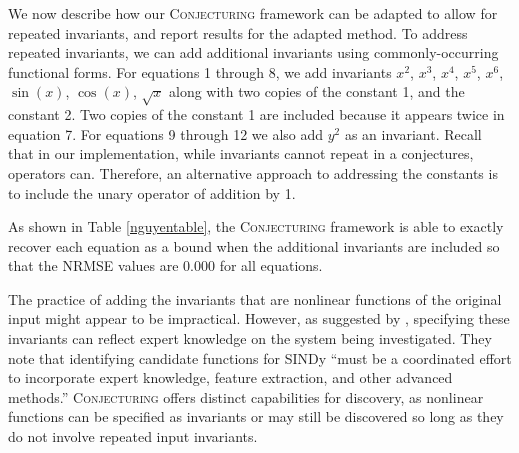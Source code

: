 \documentclass[ijds,nonblindrev]{informs-ijds}
\begin{document}
We now describe how our \textsc{Conjecturing} framework can be adapted to allow for repeated invariants, and report results for the adapted method.  To address repeated invariants, we can add additional invariants using commonly-occurring functional forms.  For equations 1 through 8, we add invariants $x^2$, $x^3$, $x^4$, $x^5$, $x^6$, $\sin(x)$, $\cos(x)$, $\sqrt{x}$ along with two copies of the constant 1, and the constant 2.  Two copies of the constant 1 are included because it appears twice in equation 7.  For equations 9 through 12 we also add $y^2$ as an invariant.  Recall that in our implementation, while invariants cannot repeat in a conjectures, operators can.  Therefore, an alternative approach to addressing the constants is to include the unary operator of addition by 1.  

As shown in Table \ref{nguyentable}, the \textsc{Conjecturing} framework is able to exactly recover each equation as a bound when the additional invariants are included so that the NRMSE values are 0.000 for all equations.

The practice of adding the invariants that are nonlinear functions of the original input might appear to be impractical.  However, as suggested by \citet{brunton}, specifying these invariants can reflect expert knowledge on the system being investigated.  They note that identifying candidate functions for SINDy ``must be a coordinated effort to incorporate expert knowledge, feature extraction, and other advanced methods.''   \textsc{Conjecturing} offers distinct capabilities for discovery, as nonlinear functions can be specified as invariants or may  still be discovered so long as they do not involve repeated input invariants. 
\end{document}

